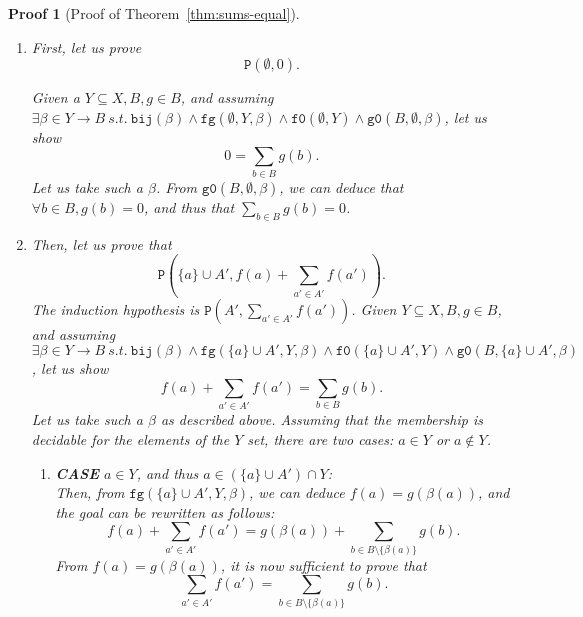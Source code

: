 \documentclass[pdflatex,sn-mathphys]{sn-jnl}%
\theoremstyle{thmstyleone}%
\theoremstyle{thmstyletwo}%
\newtheorem*{pf}{Proof}%
\theoremstyle{thmstylethree}%
\begin{document}
\begin{pf}[Proof of Theorem~\ref{thm:sums-equal}]
      \begin{enumerate}
      \item First, let us prove
        \begin{equation*}
          \boxed{\mathtt{P}(\emptyset,0).}
        \end{equation*}

        Given a $Y\subseteq{}X,B,g\in{}B$, and assuming
        $\exists{}\beta\in{}Y\rightarrow{}B~s.t.~\mathtt{bij}(\beta)\land\mathtt{fg}(\emptyset,Y,\beta)\land\mathtt{f0}(\emptyset,Y)\land\mathtt{g0}(B,\emptyset,\beta)$,
        let us show
        \begin{equation*}
          \boxed{0=\sum\limits_{b\in{}B}g(b).}
        \end{equation*}
        Let us take such a $\beta$. From $\mathtt{g0}(B,\emptyset,\beta)$,
        we can deduce that $\forall{}b\in{}B,g(b)=0$, and thus that
        $\sum\limits_{b\in{}B}g(b)=0$.
      \item Then, let us prove that
        \begin{equation*}
          \boxed{\mathtt{P}(\{a\}\cup{}A',f(a)+\sum_{a'\in{}A'}f(a')).}
        \end{equation*}
        The induction hypothesis is
        $\mathtt{P}(A',\sum\limits_{a'\in{}A'}f(a'))$. Given
        $Y\subseteq{}X,B,g\in{}B$, and assuming
        $\exists{}\beta\in{}Y\rightarrow{}B~s.t.~\mathtt{bij}(\beta)\land\mathtt{fg}(\{a\}\cup{}A',Y,\beta)\land\mathtt{f0}(\{a\}\cup{}A',Y)\land\mathtt{g0}(B,\{a\}\cup{}A',\beta)$,
        let us show
        \begin{equation*}
          \boxed{f(a)+\sum_{a'\in{}A'}f(a')=\sum\limits_{b\in{}B}g(b).}
        \end{equation*}
        Let us take such a $\beta$ as described above. Assuming that
        the membership is decidable for the elements of the $Y$ set,
        there are two cases: $a\in{}Y$ or $a\notin{}Y$.

        \begin{enumerate}
        \item \textbf{CASE} $a\in{}Y$, and thus
          $a\in(\{a\}\cup{}A')\cap{}Y$:\\

          Then, from $\mathtt{fg}(\{a\}\cup{}A',Y,\beta)$, we can deduce
          $f(a)=g(\beta(a))$, and the goal can be rewritten as follows:
          \begin{equation*}
            \boxed{f(a)+\sum_{a'\in{}A'}f(a')=g(\beta(a))+\sum\limits_{b\in{}B\setminus\{\beta(a)\}}g(b).}
          \end{equation*}
          From $f(a)=g(\beta(a))$, it is now sufficient to prove that
          \begin{equation*}
            \boxed{\sum_{a'\in{}A'}f(a')=\sum\limits_{b\in{}B\setminus\{\beta(a)\}}g(b).}
          \end{equation*}


\end{enumerate}
\end{enumerate}
\end{pf}
\end{document}
